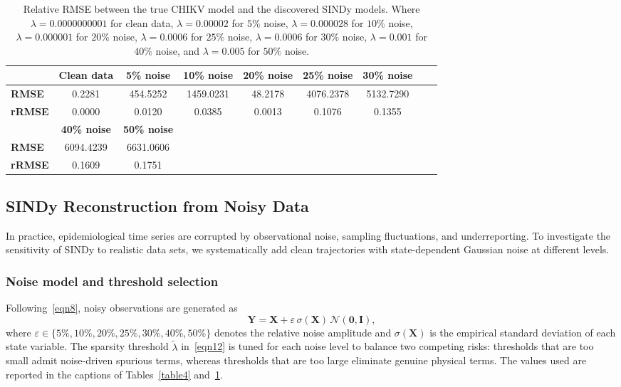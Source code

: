 \documentclass[9pt]{article}
\newcommand\bfX{\mathbf{X}}
\newcommand\bfY{\mathbf{Y}}
\numberwithin{equation}{section}
\begin{document}
\begin{table}[ht]
    \centering
    \caption{Relative RMSE between the true CHIKV model and the discovered SINDy models. Where $\lambda=0.0000000001$ for clean data, $\lambda=0.00002$ for $5\%$ noise, $\lambda=0.000028$ for $10\%$ noise, $\lambda=0.000001$ for $20\%$ noise, $\lambda=0.0006$ for $25\%$ noise, $\lambda=0.0006$ for $30\%$ noise, $\lambda=0.001$ for $40\%$ noise, and $\lambda=0.005$ for $50\%$ noise.}
    \label{table5}
    \begin{tabular}{|l|c|c|c|c|c|c|c|c|}
        \hline
        & \textbf{Clean data} & \textbf{5\% noise} & \textbf{10\% noise} & \textbf{20\% noise} & \textbf{25\% noise}& \textbf{30\% noise}\\
        \hline
        \textbf{RMSE} & 0.2281 & 454.5252 & 1459.0231 & 48.2178 & 4076.2378 & 5132.7290 \\
        \hline
        \textbf{rRMSE} & 0.0000 & 0.0120 & 0.0385 & 0.0013 & 0.1076 & 0.1355 \\
        \hline\hline
        & \textbf{40\% noise} & \textbf{50\% noise} &  &  &  &\\
        \hline
        \textbf{RMSE} & 6094.4239 & 6631.0606 & &  &  &\\
        \hline
        \textbf{rRMSE} & 0.1609 & 0.1751 &  &  &  &\\
        \hline
    \end{tabular}
\end{table}

\subsection{SINDy Reconstruction from Noisy Data}\label{sec:sindy-noisy}
In practice, epidemiological time series are corrupted by observational noise, sampling fluctuations, and underreporting. To investigate the sensitivity of SINDy to realistic data sets, we systematically add clean trajectories with state-dependent Gaussian noise at different levels.
 
\subsubsection{Noise model and threshold selection}\label{sec:sindy-noisy-setup}
Following~\eqref{eqn8}, noisy observations are generated as
\begin{equation*}
    \bfY = \bfX + \varepsilon\,\sigma(\bfX)\,\mathcal{N}(\mathbf{0},\mathbf{I}),
\end{equation*}
where $\varepsilon \in \{5\%,10\%,20\%,25\%,30\%,40\%,50\%\}$ denotes the relative noise amplitude and $\sigma(\bfX)$ is the empirical standard deviation of each state variable. The sparsity threshold $\tilde{\lambda}$ in~\eqref{eqn12} is tuned for each noise level to balance two competing risks: thresholds that are too small admit noise-driven spurious terms, whereas thresholds that are too large eliminate genuine physical terms. The values used are reported in the captions of Tables~\ref{table4} and~\ref{table5}.
\end{document}
